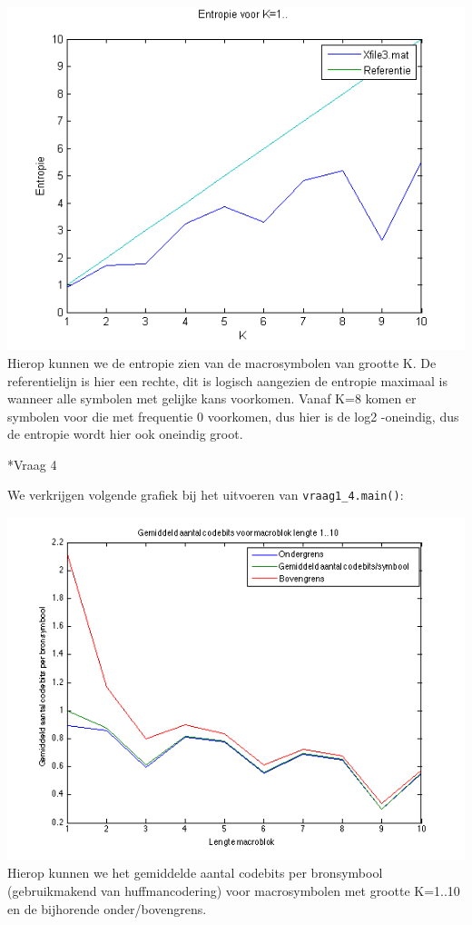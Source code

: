 \documentclass[]{article}
\begin{document}
\begin{section}
\begin{subsection}
        \includegraphics{vraag1_3.png}
		Hierop kunnen we de entropie zien van de macrosymbolen van grootte K. De referentielijn is hier een rechte, dit is logisch aangezien de entropie maximaal is wanneer alle symbolen met gelijke kans voorkomen.
		Vanaf K=8 komen er symbolen voor die met frequentie 0 voorkomen, dus hier is de log2 -oneindig, dus de entropie wordt hier ook oneindig groot.

    \end{subsection}

    \begin{subsection}*{Vraag 4}
	
        We verkrijgen volgende grafiek bij het uitvoeren van
        \texttt{vraag1\_4.main()}:

       \includegraphics[scale=0.75]{vraag1_4.png} \\
		Hierop kunnen we het gemiddelde aantal codebits per bronsymbool (gebruikmakend van huffmancodering) voor macrosymbolen met grootte K=1..10 en de bijhorende onder/bovengrens.
		

\end{subsection}
\end{section}
\end{document}
